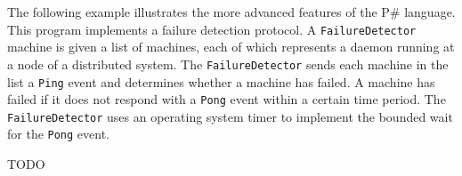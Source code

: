 \documentclass{llncs}
\newcommand{\ps}{P\#\xspace}
\begin{document}
The following example illustrates the more advanced features of the \ps language. This program implements a failure detection protocol. A \texttt{FailureDetector} machine is given a list of machines, each of which represents a daemon running at a node of a distributed system. The \texttt{FailureDetector} sends each machine in the list a \texttt{Ping} event and determines whether a machine has failed. A machine has failed if it does not respond with a \texttt{Pong} event within a certain time period. The \texttt{FailureDetector} uses an operating system timer to implement the bounded wait for the \texttt{Pong} event.

TODO




\end{document}
